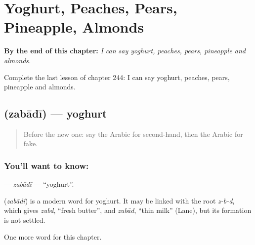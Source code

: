 
\chapter{Yoghurt, Peaches, Pears, Pineapple, Almonds}
\label{ch:ar-yoghurt-peaches-pears-pineapple-almonds}

\begin{chapteropening}
\textbf{By the end of this chapter:} \emph{I can say yoghurt, peaches, pears, pineapple and almonds.}

Complete the last lesson of chapter 244: I can say yoghurt, peaches, pears, pineapple and almonds.
\end{chapteropening}

\section[\texorpdfstring{\ar{زبادي} (zabādī)}{زبادي (zabādī)}]{ (zabādī) — yoghurt}

\label{lesson:AR-C244-zabadi}



\begin{quote}
Before the new one: say the Arabic for second-hand, then the Arabic for fake.
\end{quote}

\subsection*{You'll want to know: }
\textbf{} — \emph{zabādī} — \textquotedblleft{}yoghurt\textquotedblright{}.

\begin{cousinweb}
\textbf{} (\emph{zabādī}) is a modern word for yoghurt. It may be linked with the root \emph{z-b-d}, which gives \emph{zubd}, \textquotedblleft{}fresh butter\textquotedblright{}, and \emph{zubād}, \textquotedblleft{}thin milk\textquotedblright{} (Lane), but its formation is not settled.
\end{cousinweb}

\begin{grammarlens}[title={What you've built}]
One more word for this chapter.
\end{grammarlens}

